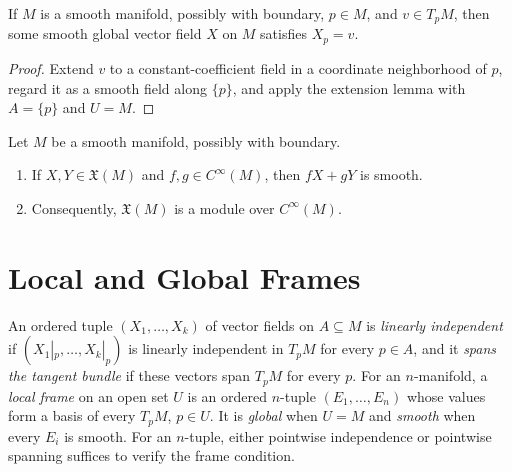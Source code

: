 \begin{proposition}
\label{prop:8-7}





If $M$ is a smooth manifold, possibly with boundary, $p\in M$, and
$v\in T_pM$, then some smooth global vector field $X$ on $M$ satisfies
$X_p=v$.
\end{proposition}

\begin{proof}

\sketch Extend $v$ to a constant-coefficient field in a coordinate
neighborhood of $p$, regard it as a smooth field along $\{p\}$, and apply the
extension lemma with $A=\{p\}$ and $U=M$.
\end{proof}

\begin{proposition}
\label{prop:8-8}




Let $M$ be a smooth manifold, possibly with boundary.
\begin{enumerate}
\item If $X,Y\in\mathfrak{X}(M)$ and $f,g\in C^\infty(M)$, then
$fX+gY$ is smooth.
\item Consequently, $\mathfrak{X}(M)$ is a module over $C^\infty(M)$.
\end{enumerate}
\end{proposition}


\section{Local and Global Frames}

\begin{definition}
\label{def:8-55-extra-1}




An ordered tuple $(X_1,\ldots,X_k)$ of vector fields on $A\subseteq M$ is
\emph{linearly independent} if $(X_1|_p,\ldots,X_k|_p)$ is linearly
independent in $T_pM$ for every $p\in A$, and it
\emph{spans the tangent bundle} if these vectors span $T_pM$ for every $p$.
For an $n$-manifold, a \emph{local frame} on an open set $U$ is an ordered
$n$-tuple $(E_1,\ldots,E_n)$ whose values form a basis of every $T_pM$,
$p\in U$. It is \emph{global} when $U=M$ and \emph{smooth} when every $E_i$
is smooth. For an $n$-tuple, either pointwise independence or pointwise
spanning suffices to verify the frame condition.
\end{definition}

